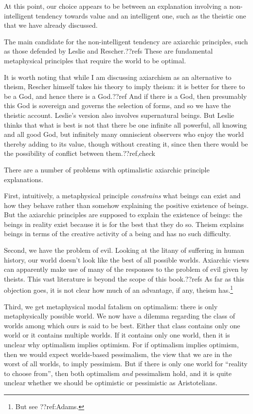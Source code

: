 At this point, our choice appears to be between an explanation involving a non-intelligent tendency towards value and an intelligent one,
such as the theistic one that we have already discussed.

The main candidate for the non-intelligent tendency are axiarchic principles, such as those defended by Leslie and Rescher.??refs
These are fundamental metaphysical principles that require the world to be optimal. 

It is worth noting that while I am discussing axiarchism as an alternative to theism, Rescher himself takes his theory to
imply theism: it is better for there to be a God, and hence there is a God.??ref And if there is a God, then presumably this God
is sovereign and governs the selection of forms, and so we have the theistic account. Leslie's version also
involves supernatural beings. But Leslie thinks that what is best is not that there be one infinite all powerful, all knowing
and all good God, but infinitely many omniscient observers who enjoy the world thereby adding to its value, though without
creating it, since then there would be the possibility of conflict between them.??ref,check

There are a number of problems with optimalistic axiarchic principle explanations.

First, intuitively, a metaphysical principle \textit{constrains} what beings can exist and how they behave rather than somehow 
explaining the positive existence of beings. But the axiarchic principles are supposed to explain the existence of beings: the beings
in reality exist because it is for the best that they do so.  Theism explains beings in terms of the creative
activity of a being and has no such difficulty.

Second, we have the problem of evil. Looking at the litany of suffering in human history, 
our world doesn't look like the best of all possible worlds. Axiarchic views can apparently make use of many of the responses to 
the problem of evil given by theists. This vast literature is beyond the scope of this book.??refs 
As far as this objection goes, it is not clear how much of an advantage, if any, theism has.\footnote{But
see ??ref:Adams.}

Third, we get metaphysical modal fatalism on optimalism: there is only metaphysically 
possible world. We now have a dilemma regarding the class of worlds among which ours is said to be best. Either that class
contains only one world or it contains multiple worlds. If it contains only one world, then it is unclear why optimalism
implies optimism. For if optimalism implies optimism, then we would expect worlds-based pessimalism, the view that we are 
in the worst of all worlds, to imply pessimism. But if there is only one world for ``reality to choose from'', then 
both optimalism \textit{and} pessimalism hold, and it is quite unclear whether we should be optimistic or pessimistic
as Aristotelians. 

